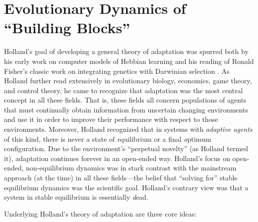 \documentclass{sig-alternate}
\begin{document}
\section{Evolutionary Dynamics of ``Building Blocks''}  

Holland's goal of developing a general theory of adaptation was
spurred both by his early work on computer models of Hebbian learning
\cite{RochesterHolland} and his reading of Ronald Fisher's classic
work on integrating genetics with Darwinian selection \cite{Genetical
  Theory of Natural Selection}.  As Holland further read extensively
in evolutionary biology, economics, game theory, and control theory,
he came to recognize that adaptation was the most central concept in
all these fields.  That is, these fields all concern populations of
agents that must continually obtain information from uncertain
changing environments and use it in order to improve their performance
with respect to those environments.  Moreover, Holland recognized that
in systems with {\em adaptive agents} of this kind, there is never a
state of {\emph equilibrium} or a final {\emph optimum} configuration.
Due to the environment's ``perpetual novelty'' (as Holland termed it),
adaptation continues forever in an open-ended way.  Holland's focus on
open-ended, non-equilibrium dynamics was in stark contrast with the
mainstream approach (at the time) in all these fields---the belief
that ``solving for'' stable equilibrium dynamics was the scientific
goal.  Holland's contrary view was that a system in stable equilibrium
is essentially {\emph dead}.

Underlying Holland's theory of adaptation are three core ideas: 
\end{document}
